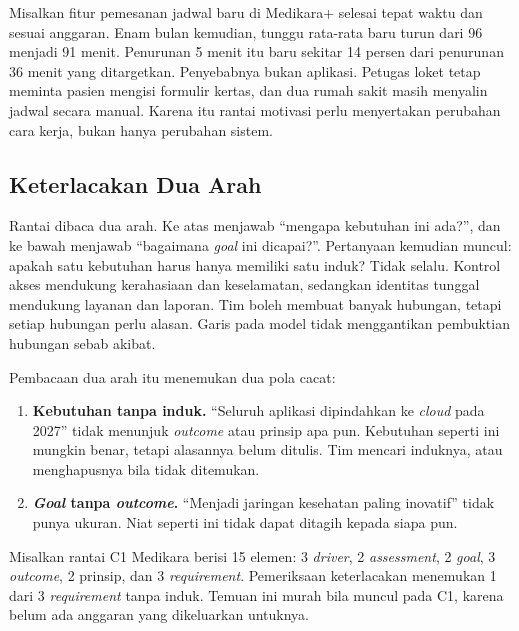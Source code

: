 Misalkan fitur pemesanan jadwal baru di Medikara+ selesai tepat waktu dan sesuai
anggaran. Enam bulan kemudian, tunggu rata-rata baru turun dari 96 menjadi 91
menit. Penurunan 5 menit itu baru sekitar 14 persen dari penurunan 36 menit yang
ditargetkan. Penyebabnya bukan aplikasi. Petugas loket tetap meminta pasien
mengisi formulir kertas, dan dua rumah sakit masih menyalin jadwal secara manual.
Karena itu rantai motivasi perlu menyertakan perubahan cara kerja, bukan hanya
perubahan sistem.

\subsection*{Keterlacakan Dua Arah}

Rantai dibaca dua arah. Ke atas menjawab ``mengapa kebutuhan ini ada?'', dan ke
bawah menjawab ``bagaimana \textit{goal} ini dicapai?''. Pertanyaan kemudian
muncul: apakah satu kebutuhan harus hanya memiliki satu induk? Tidak selalu.
Kontrol akses mendukung kerahasiaan dan keselamatan, sedangkan identitas tunggal
mendukung layanan dan laporan. Tim boleh membuat banyak hubungan, tetapi setiap
hubungan perlu alasan. Garis pada model tidak menggantikan pembuktian hubungan
sebab akibat.

Pembacaan dua arah itu menemukan dua pola cacat:

\begin{enumerate}
  \item \textbf{Kebutuhan tanpa induk.} ``Seluruh aplikasi dipindahkan ke
        \textit{cloud} pada 2027'' tidak menunjuk \textit{outcome} atau prinsip
        apa pun. Kebutuhan seperti ini mungkin benar, tetapi alasannya belum
        ditulis. Tim mencari induknya, atau menghapusnya bila tidak ditemukan.
  \item \textbf{\textit{Goal} tanpa \textit{outcome}.} ``Menjadi jaringan
        kesehatan paling inovatif'' tidak punya ukuran. Niat seperti ini tidak
        dapat ditagih kepada siapa pun.
\end{enumerate}

Misalkan rantai C1 Medikara berisi 15 elemen: 3 \textit{driver}, 2
\textit{assessment}, 2 \textit{goal}, 3 \textit{outcome}, 2 prinsip, dan 3
\textit{requirement}. Pemeriksaan keterlacakan menemukan 1 dari 3
\textit{requirement} tanpa induk. Temuan ini murah bila muncul pada C1, karena
belum ada anggaran yang dikeluarkan untuknya.


